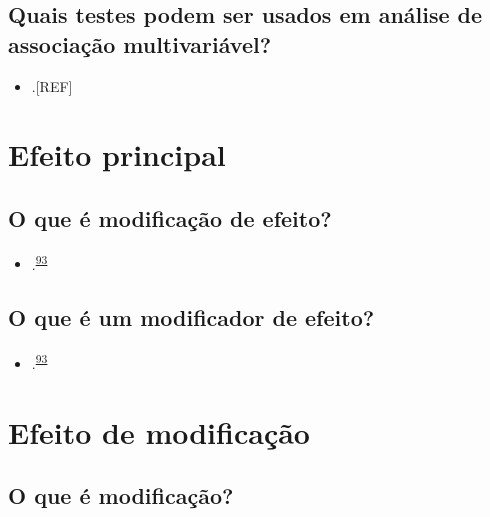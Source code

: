 \documentclass[
]{book}
\providecommand{\tightlist}{%
  \setlength{\itemsep}{0pt}\setlength{\parskip}{0pt}}
\begin{document}
\hypertarget{quais-testes-podem-ser-usados-em-anuxe1lise-de-associauxe7uxe3o-multivariuxe1vel}{%
\subsection{Quais testes podem ser usados em análise de associação multivariável?}\label{quais-testes-podem-ser-usados-em-anuxe1lise-de-associauxe7uxe3o-multivariuxe1vel}}

\begin{itemize}
\tightlist
\item
  .{[}REF{]}
\end{itemize}

\hypertarget{efeito-principal}{%
\section{Efeito principal}\label{efeito-principal}}

\hypertarget{o-que-uxe9-modificauxe7uxe3o-de-efeito}{%
\subsection{O que é modificação de efeito?}\label{o-que-uxe9-modificauxe7uxe3o-de-efeito}}

\begin{itemize}
\tightlist
\item
  .\textsuperscript{\protect\hyperlink{ref-Bours2023}{93}}
\end{itemize}

\hypertarget{o-que-uxe9-um-modificador-de-efeito}{%
\subsection{O que é um modificador de efeito?}\label{o-que-uxe9-um-modificador-de-efeito}}

\begin{itemize}
\tightlist
\item
  .\textsuperscript{\protect\hyperlink{ref-Bours2023}{93}}
\end{itemize}

\hypertarget{modificacao}{%
\section{Efeito de modificação}\label{modificacao}}

\hypertarget{o-que-uxe9-modificauxe7uxe3o}{%
\subsection{O que é modificação?}\label{o-que-uxe9-modificauxe7uxe3o}}
\end{document}
